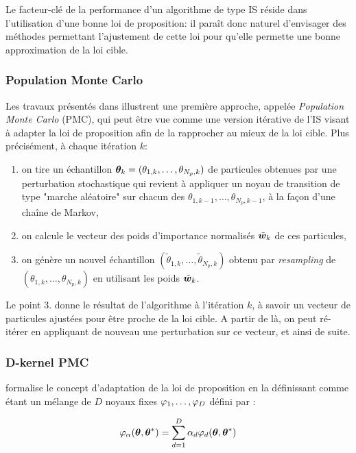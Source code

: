Le facteur-clé de la performance d'un algorithme de type IS réside dans l'utilisation d'une bonne loi de proposition: il paraît donc naturel d'envisager des méthodes permettant l'ajustement de cette loi pour qu'elle permette une bonne approximation de la loi cible. \\

\subsubsection{Population Monte Carlo}

Les travaux présentés dans \cite{Cappe2004} illustrent une première approche, appelée \textit{Population Monte Carlo} (PMC), qui peut être vue comme une version itérative de l'IS visant à adapter la loi de proposition afin de la rapprocher au mieux de la loi cible. Plus précisément, à chaque itération $k$: 

\begin{enumerate}
	\item on tire un échantillon ${\bm{\theta}}_k = (\theta_{1,k}, \dots, \theta_{N_p,k})$ de particules obtenues par une perturbation stochastique qui revient à appliquer un noyau de transition de type "marche aléatoire" sur chacun des $\theta_{1,k-1}, \dots, \theta_{N_p,k-1}$, à la façon d'une chaîne de Markov,
	\item on calcule le vecteur des poids d'importance normalisés ${\tilde{\bm{w}}}_k$ de ces particules,
	\item on génère un nouvel échantillon $(\tilde{\theta}_{1,k}, \dots, \tilde{\theta}_{N_p,k})$ obtenu par \textit{resampling} de $ (\theta_{1,k}, \dots, \theta_{N_p,k})$ en utilisant les poids ${\tilde{\bm{w}}}_k$.
\end{enumerate}

Le point 3. donne le résultat de l'algorithme à l'itération $k$, à savoir un vecteur de particules ajustées pour être proche de la loi cible. A partir de là, on peut ré-itérer en appliquant de nouveau une perturbation sur ce vecteur, et ainsi de suite. 


\subsubsection{D-kernel PMC}

\cite{Douc2007} formalise le concept d'adaptation de la loi de proposition en la définissant comme étant un mélange de $D$ noyaux fixes ${\varphi}_1, \dots, {\varphi}_D$ défini par : 

\begin{equation}
	{\varphi}_\alpha({\bm{\theta}}, {{\bm{\theta}}^*}) = \sum\limits_{d=1}^D\alpha_d {\varphi}_d({\bm{\theta}}, {{\bm{\theta}}^*})
	\label{eq_PMC_D_Kernel}
\end{equation}

